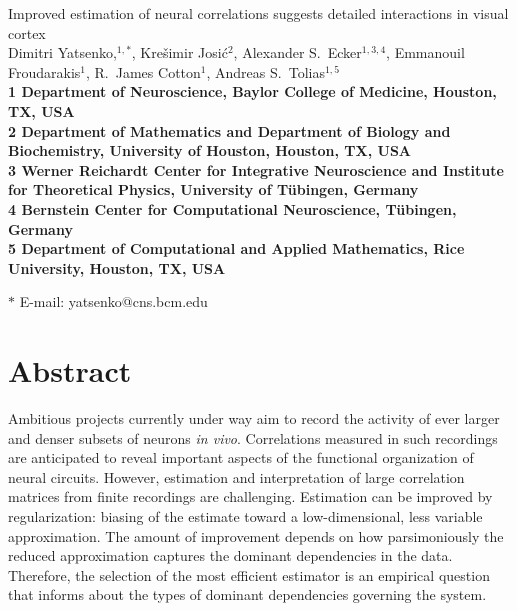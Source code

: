\documentclass[10pt]{article}
\date{}
\begin{document}
\begin{flushleft}
{\Large
Improved estimation of neural correlations suggests detailed interactions in visual cortex
}
\\
Dimitri Yatsenko,$^{1,\ast}$, 
Kre\v{s}imir Josi\'{c}$^{2}$,
Alexander S.~Ecker$^{1,3,4}$,
Emmanouil Froudarakis$^{1}$,
R.~James Cotton$^{1}$,
Andreas S.~Tolias$^{1,5}$
\\
\bf{1} Department of Neuroscience, Baylor College of Medicine, Houston, TX, USA
\\
\bf{2} Department of Mathematics and Department of Biology and Biochemistry, University of Houston, Houston, TX, USA
\\
\bf{3}  Werner Reichardt Center for Integrative Neuroscience and Institute for Theoretical Physics, University of T\"ubingen, Germany
\\
\bf{4} Bernstein Center for Computational Neuroscience, T\"ubingen, Germany
\\
\bf{5} Department of Computational and Applied Mathematics, Rice University, Houston, TX, USA

$\ast$ E-mail: yatsenko@cns.bcm.edu
\end{flushleft}

\section*{Abstract}
Ambitious projects currently under way aim to record the activity of ever larger and denser subsets of neurons \emph{in vivo}.  Correlations measured in such recordings are anticipated to reveal important aspects of the functional organization of neural circuits.  However, estimation and interpretation of large correlation matrices from finite recordings are challenging.  Estimation can be improved by regularization: biasing of the estimate toward a low-dimensional, less variable approximation.  The amount of improvement depends on how parsimoniously the reduced approximation captures the dominant dependencies in the data.  Therefore, the selection of the most efficient estimator is an empirical question that informs about the types of dominant dependencies governing the system.
\end{document}
